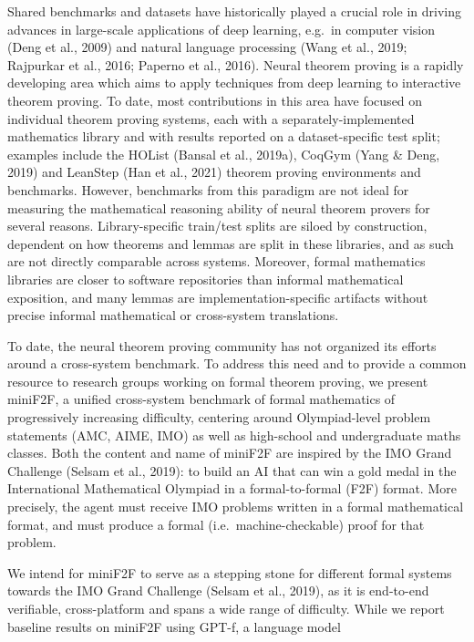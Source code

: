 \documentclass[
]{article}
\begin{document}
Shared benchmarks and datasets have historically played a crucial role
in driving advances in large-scale applications of deep learning,
e.g.~in computer vision (Deng et al., 2009) and natural language
processing (Wang et al., 2019; Rajpurkar et al., 2016; Paperno et al.,
2016). Neural theorem proving is a rapidly developing area which aims to
apply techniques from deep learning to interactive theorem proving. To
date, most contributions in this area have focused on individual theorem
proving systems, each with a separately-implemented mathematics library
and with results reported on a dataset-specific test split; examples
include the HOList (Bansal et al., 2019a), CoqGym (Yang \& Deng, 2019)
and LeanStep (Han et al., 2021) theorem proving environments and
benchmarks. However, benchmarks from this paradigm are not ideal for
measuring the mathematical reasoning ability of neural theorem provers
for several reasons. Library-specific train/test splits are siloed by
construction, dependent on how theorems and lemmas are split in these
libraries, and as such are not directly comparable across systems.
Moreover, formal mathematics libraries are closer to software
repositories than informal mathematical exposition, and many lemmas are
implementation-specific artifacts without precise informal mathematical
or cross-system translations.

To date, the neural theorem proving community has not organized its
efforts around a cross-system benchmark. To address this need and to
provide a common resource to research groups working on formal theorem
proving, we present miniF2F, a unified cross-system benchmark of formal
mathematics of progressively increasing difficulty, centering around
Olympiad-level problem statements (AMC, AIME, IMO) as well as
high-school and undergraduate maths classes. Both the content and name
of miniF2F are inspired by the IMO Grand Challenge (Selsam et al.,
2019): to build an AI that can win a gold medal in the International
Mathematical Olympiad in a formal-to-formal (F2F) format. More
precisely, the agent must receive IMO problems written in a formal
mathematical format, and must produce a formal (i.e.~machine-checkable)
proof for that problem.

We intend for miniF2F to serve as a stepping stone for different formal
systems towards the IMO Grand Challenge (Selsam et al., 2019), as it is
end-to-end verifiable, cross-platform and spans a wide range of
difficulty. While we report baseline results on miniF2F using GPT-f, a
language model
\end{document}
